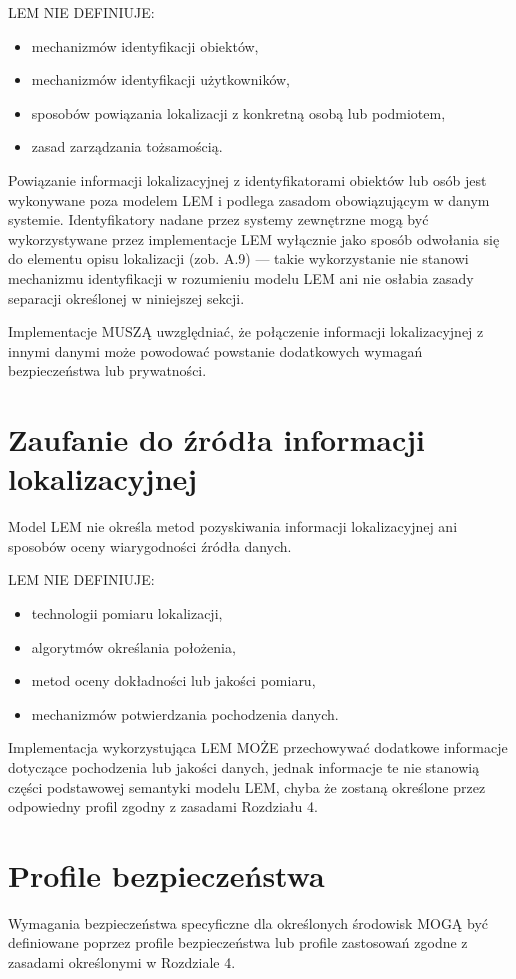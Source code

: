 LEM NIE DEFINIUJE:
\begin{itemize}
    \item mechanizmów identyfikacji obiektów,
    \item mechanizmów identyfikacji użytkowników,
    \item sposobów powiązania lokalizacji z konkretną osobą lub podmiotem,
    \item zasad zarządzania tożsamością.
\end{itemize}

Powiązanie informacji lokalizacyjnej z identyfikatorami obiektów lub osób jest wykonywane poza modelem LEM i podlega zasadom obowiązującym w danym systemie. Identyfikatory nadane przez systemy zewnętrzne mogą być wykorzystywane przez implementacje LEM wyłącznie jako sposób odwołania się do elementu opisu lokalizacji (zob. A.9) — takie wykorzystanie nie stanowi mechanizmu identyfikacji w rozumieniu modelu LEM ani nie osłabia zasady separacji określonej w niniejszej sekcji.

Implementacje MUSZĄ uwzględniać, że połączenie informacji lokalizacyjnej z innymi danymi może powodować powstanie dodatkowych wymagań bezpieczeństwa lub prywatności.

\section{Zaufanie do źródła informacji lokalizacyjnej}
Model LEM nie określa metod pozyskiwania informacji lokalizacyjnej ani sposobów oceny wiarygodności źródła danych.

LEM NIE DEFINIUJE:
\begin{itemize}
    \item technologii pomiaru lokalizacji,
    \item algorytmów określania położenia,
    \item metod oceny dokładności lub jakości pomiaru,
    \item mechanizmów potwierdzania pochodzenia danych.
\end{itemize}

Implementacja wykorzystująca LEM MOŻE przechowywać dodatkowe informacje dotyczące pochodzenia lub jakości danych, jednak informacje te nie stanowią części podstawowej semantyki modelu LEM, chyba że zostaną określone przez odpowiedny profil zgodny z zasadami Rozdziału 4.

\section{Profile bezpieczeństwa}
Wymagania bezpieczeństwa specyficzne dla określonych środowisk MOGĄ być definiowane poprzez profile bezpieczeństwa lub profile zastosowań zgodne z zasadami określonymi w Rozdziale 4.


